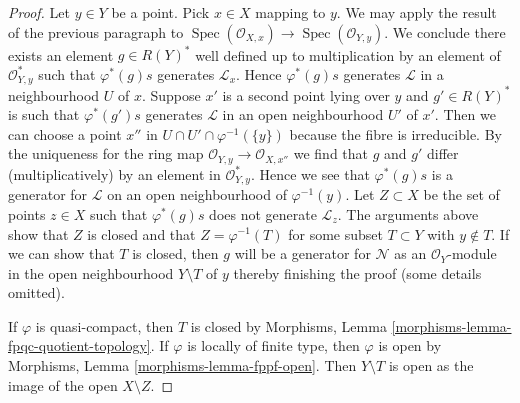 \documentclass[10pt,a4paper]{amsart}
\theoremstyle{plain}
\theoremstyle{definition}
\theoremstyle{remark}
\numberwithin{equation}{subsection}
\def\Spec{\mathop{\mathrm{Spec}}}
\begin{document}
\begin{proof}
\medskip\noindent
Let $y \in Y$ be a point.
Pick $x \in X$ mapping to $y$. We may apply the result of the previous
paragraph to $\Spec(\mathcal{O}_{X, x}) \to \Spec(\mathcal{O}_{Y, y})$.
We conclude there exists an element $g \in R(Y)^*$ well defined up to
multiplication by an element of $\mathcal{O}_{Y, y}^*$ such that
$\varphi^*(g)s$ generates $\mathcal{L}_x$. Hence $\varphi^*(g)s$
generates $\mathcal{L}$ in a neighbourhood $U$ of $x$.
Suppose $x'$ is a second point lying over $y$ and $g' \in R(Y)^*$ is
such that $\varphi^*(g')s$ generates $\mathcal{L}$ in an open neighbourhood
$U'$ of $x'$. Then we can choose a point
$x''$ in $U \cap U' \cap \varphi^{-1}(\{y\})$
because the fibre is irreducible. By the uniqueness for
the ring map $\mathcal{O}_{Y, y} \to \mathcal{O}_{X, x''}$
we find that $g$ and $g'$ differ (multiplicatively)
by an element in $\mathcal{O}_{Y, y}^*$. Hence we see that $\varphi^*(g)s$
is a generator for $\mathcal{L}$ on an open neighbourhood
of $\varphi^{-1}(y)$. Let $Z \subset X$ be the set of points
$z \in X$ such that $\varphi^*(g)s$ does not generate $\mathcal{L}_z$.
The arguments above show that $Z$ is closed and that $Z = \varphi^{-1}(T)$
for some subset $T \subset Y$ with $y \not \in T$. If we can show that
$T$ is closed, then $g$ will be a generator for $\mathcal{N}$ as an
$\mathcal{O}_Y$-module in the open neighbourhood $Y \setminus T$ of $y$
thereby finishing the proof (some details omitted).

\medskip\noindent
If $\varphi$ is quasi-compact, then $T$ is closed by
Morphisms, Lemma \ref{morphisms-lemma-fpqc-quotient-topology}.
If $\varphi$ is locally of finite type, then $\varphi$ is open
by Morphisms, Lemma \ref{morphisms-lemma-fppf-open}.
Then $Y \setminus T$ is open as the image of the open $X \setminus Z$.
\end{proof}
\end{document}
